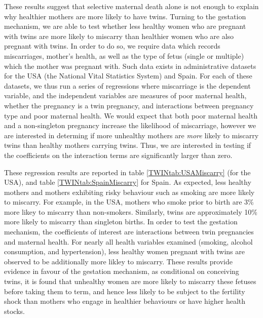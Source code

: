 \documentclass[subeqn]{article}
\begin{document}
\begin{spacing}{1.4}
These results suggest that selective maternal death alone is not enough to 
explain why healthier mothers are more likely to have twins. Turning to the 
gestation mechanism, we are able to test whether less healthy women who are 
pregnant with twins are more likely to miscarry than healthier women who are 
also pregnant with twins.  In order to do so, we require data which records
miscarriages, mother's health, as well as the type of fetus (single or 
multiple) which the mother was pregnant with.  Such data exists in 
administrative datasets for the USA (the National Vital Statistics System) and
Spain. For each of these datasets, we thus run a series of regressions where 
miscarriage is the dependent variable, and the independent variables are 
measures of poor maternal health, whether the pregnancy is a twin pregnancy, 
and interactions between pregnancy type and poor maternal health.  We would 
expect that both poor maternal health and a non-singleton pregnancy increase the 
likelihood of miscarriage, however we are interested in determing if more 
unhealthy mothers are \emph{more} likely to miscarry twins than healthy mothers 
carrying twins.  Thus, we are interested in testing if the coefficients on the 
interaction terms are significantly larger than zero.

These regression results are reported in table \ref{TWINtab:USAMiscarry} (for
the USA), and table \ref{TWINtab:SpainMiscarry} for Spain. As expected, less
healthy mothers and mothers exhibiting risky behaviour such as smoking are more 
likely to miscarry.  For example, in the USA, mothers who smoke prior to birth 
are 3\% more likey to miscarry than non-smokers.  Similarly, twins are 
approximately 10\% more likely to miscarry than singleton births. In order to
test the gestation mechanism, the coefficients of interest are interactions
between twin pregnancies and maternal health.  For nearly all health variables 
examined (smoking, alcohol consumption, and hypertension), less healthy women
pregnant with twins are observed to be additionally more likley to miscarry.
These results provide evidence in favour of the gestation mechanism, as 
conditional on conceiving twins, it is found that unhealthy women are more 
likely to miscarry these fetuses before taking them to term, and hence less
likely to be subject to the fertility shock than mothers who engage in 
healthier behaviours or have higher health stocks.


\end{spacing}
\end{document}
